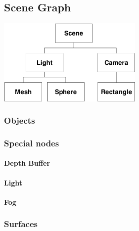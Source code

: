 \subsection{Scene Graph}

\begin{center}
\includegraphics[width=7cm]{media/scene.pdf}
\end{center}

\paragraph{}

\subsubsection{Objects}



\subsubsection{Special nodes\label{RendSpecial}}
\paragraph{}

\paragraph{Depth Buffer}
\paragraph{Light}
\paragraph{Fog}


\subsubsection{Surfaces}

